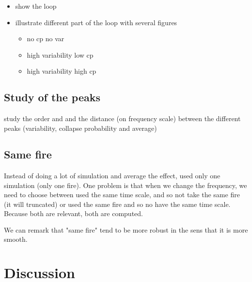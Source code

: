 \documentclass{article}
\begin{document}
\begin{itemize}
    \item show the loop
    \item illustrate different part of the loop with several figures
    \begin{itemize}
        \item no cp no var
        \item high variability low cp
        \item high variability high cp
    \end{itemize}
\end{itemize}

\subsection{Study of the peaks}

\paragraph{}
study the order and and the distance (on frequency scale) between the different peaks (variability, collapse probability and average)


\subsection{Same fire}

\paragraph{}
Instead of doing a lot of simulation and average the effect, used only one simulation (only one fire). One problem is that when we change the frequency, we need to choose between used the same time scale, and so not take the same fire (it will truncated) or used the same fire and so no have the same time scale. Because both are relevant, both are computed. 

We can remark that "same fire" tend to be more robust in the sens that it is more smooth.


\newpage
\section{Discussion}
\end{document}
